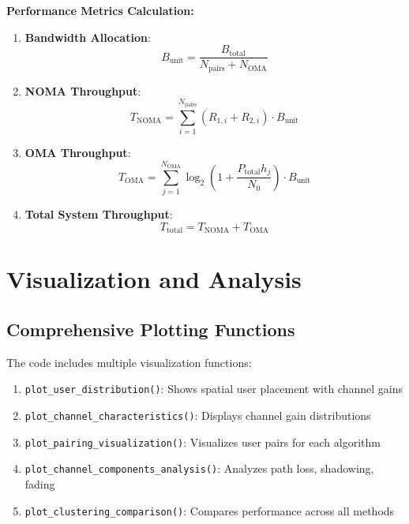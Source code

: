 \documentclass[11pt,a4paper]{article}
\begin{document}
\textbf{Performance Metrics Calculation:}

\begin{enumerate}
    \item \textbf{Bandwidth Allocation}:
    \begin{equation}
    B_{\text{unit}} = \frac{B_{\text{total}}}{N_{\text{pairs}} + N_{\text{OMA}}}
    \end{equation}
    
    \item \textbf{NOMA Throughput}:
    \begin{equation}
    T_{\text{NOMA}} = \sum_{i=1}^{N_{\text{pairs}}} (R_{1,i} + R_{2,i}) \cdot B_{\text{unit}}
    \end{equation}
    
    \item \textbf{OMA Throughput}:
    \begin{equation}
    T_{\text{OMA}} = \sum_{j=1}^{N_{\text{OMA}}} \log_2\left(1 + \frac{P_{\text{total}} h_j}{N_0}\right) \cdot B_{\text{unit}}
    \end{equation}
    
    \item \textbf{Total System Throughput}:
    \begin{equation}
    T_{\text{total}} = T_{\text{NOMA}} + T_{\text{OMA}}
    \end{equation}
\end{enumerate}

\section{Visualization and Analysis}

\subsection{Comprehensive Plotting Functions}

The code includes multiple visualization functions:

\begin{enumerate}
    \item \texttt{plot\_user\_distribution()}: Shows spatial user placement with channel gains
    \item \texttt{plot\_channel\_characteristics()}: Displays channel gain distributions
    \item \texttt{plot\_pairing\_visualization()}: Visualizes user pairs for each algorithm
    \item \texttt{plot\_channel\_components\_analysis()}: Analyzes path loss, shadowing, fading
    \item \texttt{plot\_clustering\_comparison()}: Compares performance across all methods
\end{enumerate}
\end{document}
